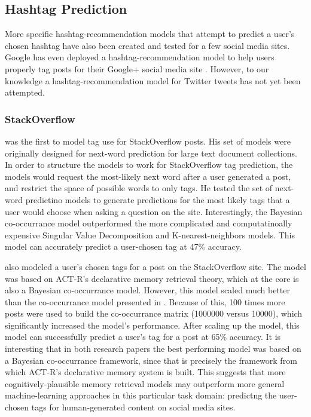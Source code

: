 \documentclass[man,floatsintext]{apa6}
\begin{document}
\subsection{Hashtag Prediction}

More specific hashtag-recommendation models that attempt to predict a user's chosen hashtag have also been created and tested for a few social media sites.
Google has even deployed a hashtag-recommendation model to help users properly tag posts for their Google+ social media site \parencite{GoogleKeynote2013}.
However, to our knowledge a hashtag-recommendation model for Twitter tweets has not yet been attempted.

\subsubsection{StackOverflow}

\textcite{Kuo2011} was the first to model tag use for StackOverflow posts.
His set of models were originally designed for next-word prediction for large text document collections.
In order to structure the models to work for StackOverflow tag prediction, the models would request the most-likely next word after a user generated a post, and restrict the space of possible words to only tags.
He tested the set of next-word predictino models to generate predictions for the most likely tags that a user would choose when asking a question on the site.
Interestingly, the Bayesian co-occurrance model outperformed the more complicated and computatinoally expensive Singular Value Decomposition and K-nearest-neighbors models.
This model can accurately predict a user-chosen tag at 47\% accuracy.

\textcite{Stanley2013} also modeled a user's chosen tags for a post on the StackOverflow site.
The model was based on ACT-R's declarative memory retrieval theory, which at the core is also a Bayesian co-occurrance model.
However, this model scaled much better than the co-occurrance model presented in \textcite{Kuo2011}.
Because of this, 100 times more posts were used to build the co-occurrance matrix (\num{1000000} versus \num{10000}), which significantly increased the model's performance.
After scaling up the model, this model can successfully predict a user's tag for a post at 65\% accuracy.
It is interesting that in both research papers the best performing model was based on a Bayesian co-occurrance framework, since that is precisely the framework from which ACT-R's declarative memory system is built.
This suggests that more cognitively-plausible memory retrieval models may outperform more general machine-learning approaches in this particular task domain:
predictng the user-chosen tags for human-generated content on social media sites.
\end{document}
